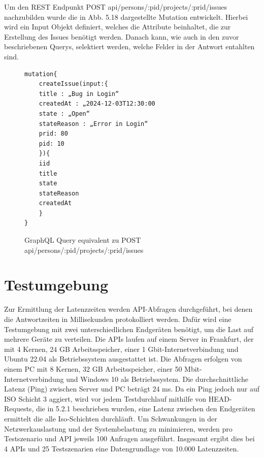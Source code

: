 \noindent
Um den REST Endpunkt POST api/persons/:pid/projects/:prid/issues nachzubilden wurde die in Abb. 5.18 dargestellte Mutation entwickelt. Hierbei wird ein Input Objekt definiert, welches die Attribute beinhaltet, die zur Erstellung des Issues benötigt werden. Danach kann, wie auch in den zuvor beschriebenen Querys, selektiert werden, welche Felder in der Antwort entahlten sind.
\begin{figure}[H]
\begin{center}
\begin{BVerbatim}
mutation{
    createIssue(input:{
	title : „Bug in Login“
	createdAt : „2024-12-03T12:30:00
	state : „Open“
	stateReason : „Error in Login“
	prid: 80
	pid: 10
	}){
	iid
	title
	state
	stateReason
	createdAt
    }
}
\end{BVerbatim}
\end{center}
\caption{GraphQL Query equivalent zu POST api/persons/:pid/projects/:prid/issues}
\end{figure}

\label{sec:graphql}

\section{Testumgebung} %
\label{sec:testumgebung}
Zur Ermittlung der Latenzzeiten werden API-Abfragen durchgeführt, bei denen die Antwortzeiten in Millisekunden protokolliert werden. Dafür wird eine Testumgebung mit zwei unterschiedlichen Endgeräten benötigt, um die Last auf mehrere Geräte zu verteilen. Die APIs laufen auf einem Server in Frankfurt, der mit 4 Kernen, 24 GB Arbeitsspeicher, einer 1 Gbit-Internetverbindung und Ubuntu 22.04 als Betriebssystem ausgestattet ist.
\newline
Die Abfragen erfolgen von einem PC mit 8 Kernen, 32 GB Arbeitsspeicher, einer 50 Mbit-Internetverbindung und Windows 10 als Betriebssystem. Die durchschnittliche Latenz (Ping) zwischen Server und PC beträgt 24 ms. Da ein Ping jedoch nur auf ISO Schicht 3 aggiert, wird vor jedem Testdurchlauf mithilfe von HEAD-Requests, die in 5.2.1 beschrieben wurden, eine Latenz zwischen den Endgeräten ermittelt die alle Iso-Schichten durchläuft. Um Schwankungen in der Netzwerkauslastung und der Systembelastung zu minimieren, werden pro Testszenario und API jeweils 100 Anfragen ausgeführt. Insgesamt ergibt dies bei 4 APIs und 25 Testszenarien eine Datengrundlage von 10.000 Latenzzeiten.




